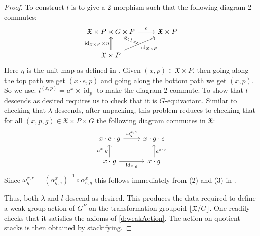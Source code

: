 \documentclass[12pt, final]{amsart}
\theoremstyle{remark}
\theoremstyle{definition}
\theoremstyle{plain}
\newcommand{\fX}{{\mathfrak X}}
\DeclareMathOperator{\id}{id}
\begin{document}
\begin{proof}
    To construct $l$ is to give a 2-morphism such that the following diagram 2-commutes:
    $$
    \begin{tikzcd}
        {\fX\times P \times G \times P} & {\fX \times P} \\
        {\fX \times P}
        \arrow["\rho", from=1-1, to=1-2]
        \arrow["\id_{\fX \times P} \times \eta", from=2-1, to=1-1]
        \arrow[""{name=0, anchor=center, inner sep=0}, "{\id_{\fX\times P}}"', from=2-1, to=1-2]
        \arrow["l"{description}, Rightarrow, from=0, to=1-1]
    \end{tikzcd} 
    $$ Here $\eta$ is the unit map as defined in .
    Given $(x,p) \in \fX \times P$, then going along the top path we get $(x\cdot e,p)$ and 
    going along the bottom path we get $(x,p)$. So we use:
    $l^{(x,p)} = a^{x} \times \id_p$ to make the diagram 2-commute.
    To show that $l$ descends as desired requires us to check that it is $G$-equivariant.
    Similar to checking that $\lambda$ descends, after unpacking, this problem reduces to checking
    that for all $(x,p,g) \in \fX \times P \times G$ the following diagram commutes in $\fX$:
    $$
    \begin{tikzcd}
        {x\cdot e \cdot g} & {x\cdot g \cdot e} \\
        {x\cdot g} & {x\cdot g}
        \arrow["{\omega_{g}^{x,e}}", from=1-1, to=1-2]
        \arrow["{a^{x}\cdot g}", from=2-1, to=1-1]
        \arrow["{\id_{x\cdot g}}"', from=2-1, to=2-2]
        \arrow["{a^{x\cdot g}}"', from=2-2, to=1-2]
    \end{tikzcd}
    $$
    Since $\omega_{g}^{x,e} = (\alpha_{g,e}^{x})^{-1}\circ\alpha_{e,g}^{x}$
    this follows immediately from (2) and (3) in .

    Thus, both $\lambda$ and $l$ descend as desired. This produces the data required to 
    define a weak group action of $G^P$ on the transformation groupoid $\lfloor \fX/G\rfloor$. 
    One readily checks that it satisfies the axioms of \ref{d:weakAction}. The 
    action on quotient stacks is then obtained by stackifying.
\end{proof}



\end{document}
